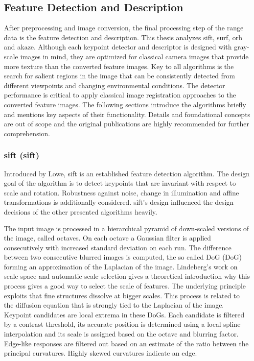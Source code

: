 \subsection{Feature Detection and Description}\label{sec:feature_algorithms}

After preprocessing and image conversion, the final processing step of the range data is the feature detection and description.
This thesis analyzes \acrshort{sift}\cite{lowe_ijcv04}, \acrshort{surf}\cite{bay_eccv06}, \acrshort{orb}\cite{rublee_iccv11} and \acrshort{akaze}\cite{alcantarilla_bmva13}.
Although each keypoint detector and descriptor is designed with gray-scale images in mind, they are optimized for classical camera images that provide more texture than the converted feature images.
Key to all algorithms is the search for salient regions in the image that can be consistently detected from different viewpoints and changing environmental conditions.
The detector performance is critical to apply classical image registration approaches to the converted feature images.
The following sections introduce the algorithms briefly and mentions key aspects of their functionality.
Details and foundational concepts are out of scope and the original publications are highly recommended for further comprehension.

\subsubsection{\acrshort{sift} (\acrlong{sift})}

Introduced by Lowe\cite{lowe_iccv99,lowe_ijcv04}, \acrshort{sift} is an established feature detection algorithm.
The design goal of the algorithm is to detect keypoints that are invariant with respect to scale and rotation.
Robustness against noise, change in illumination and affine transformations is additionally considered.
\acrshort{sift}'s design influenced the design decisions of the other presented algorithms heavily.

The input image is processed in a hierarchical pyramid of down-scaled versions of the image, called octaves.
On each octave a Gaussian filter is applied consecutively with increased standard deviation on each run.
The difference between two consecutive blurred images is computed, the so called \acrlong{DoG} (\acrshort{DoG}) forming an approximation of the Laplacian of the image.
Lindeberg's\cite{lindeberg_ijcv98} work on scale space and automatic scale selection gives a theoretical introduction why this process gives a good way to select the scale of features.
The underlying principle exploits that fine structures dissolve at bigger scales.
This process is related to the diffusion equation that is strongly tied to the Laplacian of the image.
Keypoint candidates are local extrema in these \acrshort{DoG}s.
Each candidate is filtered by a contrast threshold, its accurate position is determined using a local spline interpolation and its scale is assigned based on the octave and blurring factor.
Edge-like responses are filtered out based on an estimate of the ratio between the principal curvatures.
Highly skewed curvatures indicate an edge.

